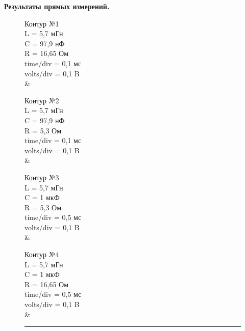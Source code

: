 \documentclass[ a4paper]{article}
\begin{document}
\newpage
	{\parindent=0pt\textbf{Результаты прямых измерений.}}\\
\begin{figure}[htb]
	\begin{minipage}[c][4.3in][t]{0.2\textwidth}
		\centering Контур №1\\
		L = 5,7 мГн\\
		 C = 97,9 нФ\\
		  R = 16,65 Ом\\
		  time/div = 0,1 мс\\
		  volts/div = 0,1 B\\
		  \vspace{0.25cm}
		{  \X & \Y}
	\end{minipage}
	\hfill
	\begin{minipage}[c][4.3in][t]{0.2\textwidth}
				\centering Контур №2\\
		L = 5,7 мГн\\
		C = 97,9 нФ\\
		R = 5,3 Ом\\
		time/div = 0,1 мс\\
		volts/div = 0,1 B\\
		\vspace{0.25cm}
	{  \X & \Y}
	\end{minipage}
\hfill
			\begin{minipage}[c][4.3in][t]{0.2\textwidth}
						\centering Контур №3\\
				L = 5,7 мГн\\
				C = 1 мкФ\\
				R = 5,3 Ом\\
				time/div = 0,5 мс\\
				volts/div = 0,1 B\\
				\vspace{0.25cm}
	{  \X & \Y}
\end{minipage}
\hfill
\begin{minipage}[c][4.3in][t]{0.2\textwidth}
							\centering Контур №4\\
	L = 5,7 мГн\\
	C = 1 мкФ\\
	R = 16,65 Ом\\
	time/div = 0,5 мс\\
	volts/div = 0,1 B\\
	\vspace{0.25cm}
	{  \X & \Y}
\end{minipage}
\rule{164mm}{0.3mm}
\end{figure}
\end{document}
